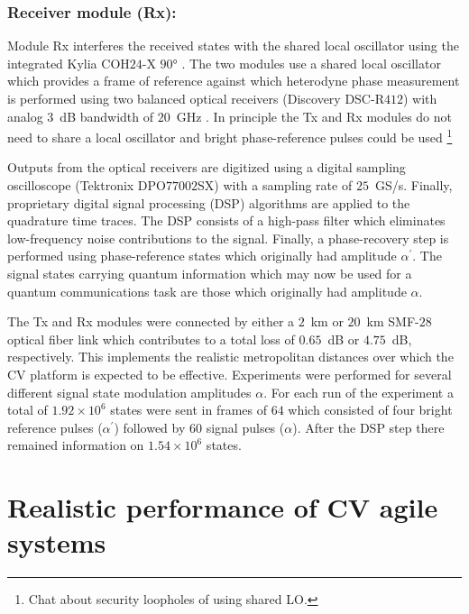 \subsubsection{Receiver module (Rx):}
Module Rx interferes the received states with the shared local oscillator using the integrated Kylia COH$24$-X $90\si{\degree}$ . The two modules use a shared local oscillator which provides a frame of reference against which heterodyne phase measurement is performed using two balanced optical receivers (Discovery DSC-R$412$) with analog $3$~dB bandwidth of $20$~GHz . In principle the Tx and Rx modules do not need to share a local oscillator and bright phase-reference pulses could be used \footnote{Chat about security loopholes of using shared LO.}

Outputs from the optical receivers are digitized using a digital sampling oscilloscope (Tektronix DPO$77002$SX) with a sampling rate of $25$~GS/s. Finally, proprietary digital signal processing (DSP) algorithms are applied to the quadrature time traces. The DSP consists of a high-pass filter which eliminates low-frequency noise contributions to the signal. Finally, a phase-recovery step is performed using phase-reference states which originally had amplitude $\alpha^\prime$. The signal states carrying quantum information which may now be used for a quantum communications task are those which originally had amplitude $\alpha$.

The Tx and Rx modules were connected by either a $2$~km or $20$~km SMF-$28$ optical fiber link which contributes to a total loss of $0.65$~dB or $4.75$~dB, respectively. This implements the realistic metropolitan distances over which the CV platform is expected to be effective. Experiments were performed for several different signal state modulation amplitudes $\alpha$. For each run of the experiment a total of $1.92\times 10^6$ states were sent in frames of $64$ which consisted of four bright reference pulses ($\alpha^\prime$) followed by $60$ signal pulses ($\alpha$). After the DSP step there remained information on $1.54 \times 10^6$ states. 

\section{Realistic performance of CV agile systems}




